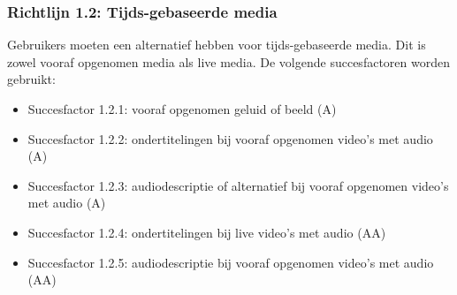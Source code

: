 \subsubsection{Richtlijn 1.2: Tijds-gebaseerde media}
Gebruikers moeten een alternatief hebben voor tijds-gebaseerde media. Dit is zowel vooraf opgenomen media als live media. De volgende succesfactoren worden gebruikt: \begin{itemize}
    \item Succesfactor 1.2.1: vooraf opgenomen geluid of beeld (A)
    \item Succesfactor 1.2.2: ondertitelingen bij vooraf opgenomen video’s met audio (A)
    \item Succesfactor 1.2.3: audiodescriptie of alternatief bij vooraf opgenomen video’s met audio (A)
    \item Succesfactor 1.2.4: ondertitelingen bij live video’s met audio (AA)
    \item Succesfactor 1.2.5: audiodescriptie bij vooraf opgenomen video’s met audio (AA)
\end{itemize}
\newpage
